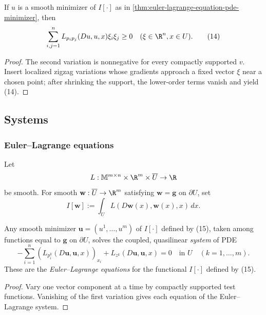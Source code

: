 \begin{proposition}
\label{prop:second-variation-convexity-necessary-condition}
If $u$ is a smooth minimizer of $I[\cdot]$ as in \cref{thm:euler-lagrange-equation-pde-minimizer}, then
\[
\sum_{i,j=1}^n L_{p_i p_j}(Du, u, x)\xi_i \xi_j \geq 0 \quad (\xi \in \R^n, x \in U).
\tag{14}
\]
\end{proposition}

\begin{proof}
\sketch The second variation is nonnegative for every compactly supported $v$. Insert localized zigzag variations whose gradients approach a fixed vector $\xi$ near a chosen point; after shrinking the support, the lower-order terms vanish and yield (14).
\end{proof}

\subsection{Systems}
\label{sec:systems-calculus-of-variations}

\subsubsection{Euler--Lagrange equations}

Let
\[
L:\mathbb{M}^{m\times n}\times\R^m\times\overline U\to\R
\]
be smooth. For smooth $\mathbf w:\overline U\to\R^m$ satisfying
$\mathbf w=\mathbf g$ on $\partial U$, set
\[
I[\mathbf w]:=\int_U L(D\mathbf w(x),\mathbf w(x),x)\,dx.
\tag{15}
\]

\begin{theorem}
\label{thm:euler-lagrange-system-pde-minimizer}
Any smooth minimizer $\mathbf{u} = (u^1,\ldots,u^m)$ of $I[\cdot]$ defined by (15), taken among functions equal to $\mathbf{g}$ on $\partial U$, solves the coupled, quasilinear \textit{system} of PDE
\[
-\sum_{i=1}^n \left( L_{p_i^k}(D\mathbf{u}, \mathbf{u}, x) \right)_{x_i} + L_{z^k}(D\mathbf{u}, \mathbf{u}, x) = 0 \quad \text{in } U \quad (k = 1, \ldots, m).
\]
These are the \textit{Euler--Lagrange equations} for the functional $I[\cdot]$ defined by (15).
\end{theorem}

\begin{proof}
\sketch Vary one vector component at a time by compactly supported test functions. Vanishing of the first variation gives each equation of the Euler--Lagrange system.
\end{proof}

